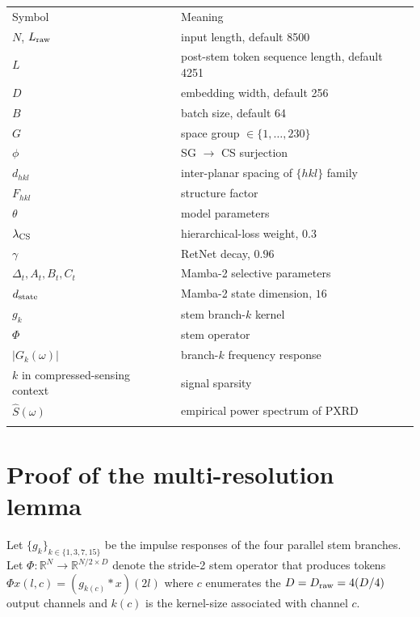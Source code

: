 \documentclass[final]{ws-ijwmip}
\begin{document}
\begin{table}[!htbp]
{\begin{tabular}{ll}
\toprule
Symbol & Meaning \\
\colrule
$N$, $L_{\rm raw}$ & input length, default 8500 \\
$L$ & post-stem token sequence length, default 4251 \\
$D$ & embedding width, default 256 \\
$B$ & batch size, default 64 \\
$G$ & space group $\in \{1,\dots,230\}$ \\
$\phi$ & SG $\to$ CS surjection \\
$d_{hkl}$ & inter-planar spacing of $\{hkl\}$ family \\
$F_{hkl}$ & structure factor \\
$\theta$ & model parameters \\
$\lambda_{\rm CS}$ & hierarchical-loss weight, $0.3$ \\
$\gamma$ & RetNet decay, $0.96$ \\
$\Delta_t, A_t, B_t, C_t$ & Mamba-2 selective parameters \\
$d_{\rm state}$ & Mamba-2 state dimension, $16$ \\
$g_k$ & stem branch-$k$ kernel \\
$\Phi$ & stem operator \\
$|G_k(\omega)|$ & branch-$k$ frequency response \\
$k$ in compressed-sensing context & signal sparsity \\
$\hat S(\omega)$ & empirical power spectrum of PXRD \\
\botrule
\end{tabular}}
\end{table}

\section{Proof of the multi-resolution lemma}
\label{app:c}

Let $\{g_k\}_{k\in\{1,3,7,15\}}$ be the impulse responses of the
four parallel stem branches. Let $\Phi:\mathbb{R}^{N}\to\mathbb{R}^{N/2\times D}$
denote the stride-2 stem operator that produces tokens
$\Phi x(l, c) = (g_{k(c)} * x)(2l)$ where $c$ enumerates the
$D = D_{\rm raw}=4(D/4)$ output channels and $k(c)$ is the kernel-size
associated with channel $c$.
\end{document}
